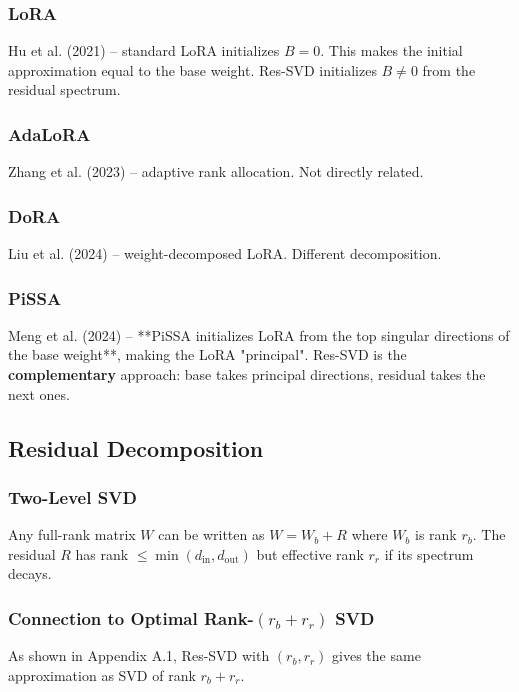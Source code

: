 \subsubsection{LoRA}

Hu et al. (2021) -- standard LoRA initializes $B = 0$. This makes the 
initial approximation equal to the base weight. Res-SVD initializes 
$B \neq 0$ from the residual spectrum.

\subsubsection{AdaLoRA}

Zhang et al. (2023) -- adaptive rank allocation. Not directly related.

\subsubsection{DoRA}

Liu et al. (2024) -- weight-decomposed LoRA. Different decomposition.

\subsubsection{PiSSA}

Meng et al. (2024) -- **PiSSA initializes LoRA from the top singular 
directions of the base weight**, making the LoRA "principal". Res-SVD is 
the \textbf{complementary} approach: base takes principal directions, residual 
takes the next ones.

\subsection{Residual Decomposition}

\subsubsection{Two-Level SVD}

Any full-rank matrix $W$ can be written as $W = W_b + R$ where $W_b$ is 
rank $r_b$. The residual $R$ has rank $\leq \min(d_\text{in}, d_\text{out})$ 
but effective rank $r_r$ if its spectrum decays.

\subsubsection{Connection to Optimal Rank-$(r_b + r_r)$ SVD}

As shown in Appendix A.1, Res-SVD with $(r_b, r_r)$ gives the same 
approximation as SVD of rank $r_b + r_r$.


